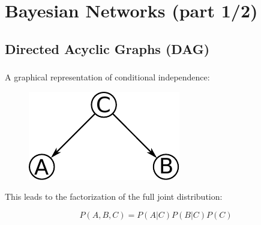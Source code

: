 \section{Bayesian Networks (part 1/2)}






\subsection{Directed Acyclic Graphs (DAG)}


\begin{frame}\frametitle{\subsecname}

A graphical representation of conditional independence:
\begin{figure}[h]
	\centering
	\includegraphics[width=0.3\linewidth]{img/cond}%
    \label{fig:cond}%
\end{figure}

This leads to the factorization of the full joint distribution:

\begin{equation}
P(A,B,C) = P(A|C)P(B|C)P(C)
\end{equation}

\end{frame}


